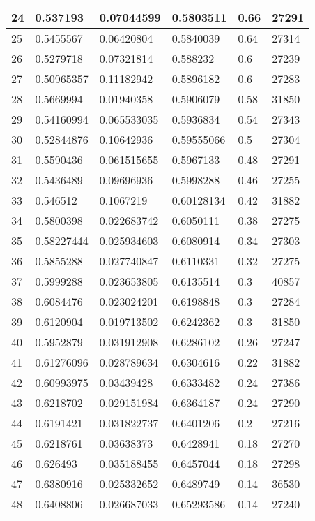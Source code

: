 \begin{longtable}{|l|l|l|l|l|l|}
24 & 0.537193 & 0.07044599 & 0.5803511 & 0.66 & 27291 \\ \hline 
25 & 0.5455567 & 0.06420804 & 0.5840039 & 0.64 & 27314 \\ \hline 
26 & 0.5279718 & 0.07321814 & 0.588232 & 0.6 & 27239 \\ \hline 
27 & 0.50965357 & 0.11182942 & 0.5896182 & 0.6 & 27283 \\ \hline 
28 & 0.5669994 & 0.01940358 & 0.5906079 & 0.58 & 31850 \\ \hline 
29 & 0.54160994 & 0.065533035 & 0.5936834 & 0.54 & 27343 \\ \hline 
30 & 0.52844876 & 0.10642936 & 0.59555066 & 0.5 & 27304 \\ \hline 
31 & 0.5590436 & 0.061515655 & 0.5967133 & 0.48 & 27291 \\ \hline 
32 & 0.5436489 & 0.09696936 & 0.5998288 & 0.46 & 27255 \\ \hline 
33 & 0.546512 & 0.1067219 & 0.60128134 & 0.42 & 31882 \\ \hline 
34 & 0.5800398 & 0.022683742 & 0.6050111 & 0.38 & 27275 \\ \hline 
35 & 0.58227444 & 0.025934603 & 0.6080914 & 0.34 & 27303 \\ \hline 
36 & 0.5855288 & 0.027740847 & 0.6110331 & 0.32 & 27275 \\ \hline 
37 & 0.5999288 & 0.023653805 & 0.6135514 & 0.3 & 40857 \\ \hline 
38 & 0.6084476 & 0.023024201 & 0.6198848 & 0.3 & 27284 \\ \hline 
39 & 0.6120904 & 0.019713502 & 0.6242362 & 0.3 & 31850 \\ \hline 
40 & 0.5952879 & 0.031912908 & 0.6286102 & 0.26 & 27247 \\ \hline 
41 & 0.61276096 & 0.028789634 & 0.6304616 & 0.22 & 31882 \\ \hline 
42 & 0.60993975 & 0.03439428 & 0.6333482 & 0.24 & 27386 \\ \hline 
43 & 0.6218702 & 0.029151984 & 0.6364187 & 0.24 & 27290 \\ \hline 
44 & 0.6191421 & 0.031822737 & 0.6401206 & 0.2 & 27216 \\ \hline 
45 & 0.6218761 & 0.03638373 & 0.6428941 & 0.18 & 27270 \\ \hline 
46 & 0.626493 & 0.035188455 & 0.6457044 & 0.18 & 27298 \\ \hline 
47 & 0.6380916 & 0.025332652 & 0.6489749 & 0.14 & 36530 \\ \hline 
48 & 0.6408806 & 0.026687033 & 0.65293586 & 0.14 & 27240 \\ \hline 

\end{longtable}
